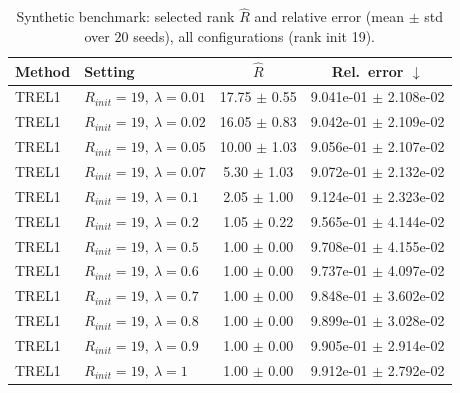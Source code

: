 \begin{table}[t]
\centering
\caption{Synthetic benchmark: selected rank \(\hat R\) and relative error (mean \(\pm\) std over \(20\) seeds), all configurations (rank init 19).}
\label{tab:results_synth_all}
\begin{tabular}{@{}llcc@{}}
\toprule
Method & Setting & \(\hat R\) & Rel.\ error \(\downarrow\) \\ \midrule
TREL1 & \(R_{init}=19,\ \lambda=0.01\) & 17.75 $\pm$ 0.55 & 9.041e-01 $\pm$ 2.108e-02 \\
TREL1 & \(R_{init}=19,\ \lambda=0.02\) & 16.05 $\pm$ 0.83 & 9.042e-01 $\pm$ 2.109e-02 \\
TREL1 & \(R_{init}=19,\ \lambda=0.05\) & 10.00 $\pm$ 1.03 & 9.056e-01 $\pm$ 2.107e-02 \\
TREL1 & \(R_{init}=19,\ \lambda=0.07\) & 5.30 $\pm$ 1.03 & 9.072e-01 $\pm$ 2.132e-02 \\
TREL1 & \(R_{init}=19,\ \lambda=0.1\) & 2.05 $\pm$ 1.00 & 9.124e-01 $\pm$ 2.323e-02 \\
TREL1 & \(R_{init}=19,\ \lambda=0.2\) & 1.05 $\pm$ 0.22 & 9.565e-01 $\pm$ 4.144e-02 \\
TREL1 & \(R_{init}=19,\ \lambda=0.5\) & 1.00 $\pm$ 0.00 & 9.708e-01 $\pm$ 4.155e-02 \\
TREL1 & \(R_{init}=19,\ \lambda=0.6\) & 1.00 $\pm$ 0.00 & 9.737e-01 $\pm$ 4.097e-02 \\
TREL1 & \(R_{init}=19,\ \lambda=0.7\) & 1.00 $\pm$ 0.00 & 9.848e-01 $\pm$ 3.602e-02 \\
TREL1 & \(R_{init}=19,\ \lambda=0.8\) & 1.00 $\pm$ 0.00 & 9.899e-01 $\pm$ 3.028e-02 \\
TREL1 & \(R_{init}=19,\ \lambda=0.9\) & 1.00 $\pm$ 0.00 & 9.905e-01 $\pm$ 2.914e-02 \\
TREL1 & \(R_{init}=19,\ \lambda=1\) & 1.00 $\pm$ 0.00 & 9.912e-01 $\pm$ 2.792e-02 \\
\bottomrule
\end{tabular}
\end{table}
